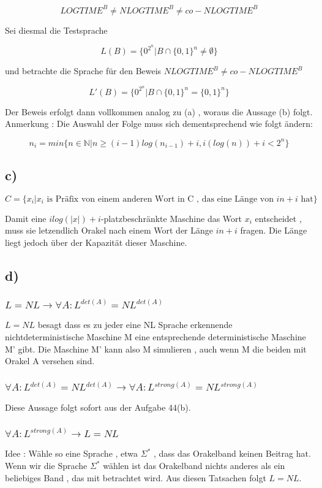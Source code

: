 \documentclass{article}
\begin{document}
			\[
				LOGTIME^B \neq NLOGTIME^B \neq co-NLOGTIME^B
			\]


			Sei diesmal die Testsprache 

			\[
				L(B) = \{0^{2^n} | B \cap \{0,1\}^n \neq \emptyset \}
			\]


			und betrachte die Sprache für den Beweis $NLOGTIME^B \neq co-NLOGTIME^B$
		
			\[
				L'(B) = \{ 0^{2^n} | B \cap \{0,1\}^n = \{0,1\}^n \}
			\]
			

			Der Beweis erfolgt dann vollkommen analog zu (a) , woraus die Aussage (b) folgt.
			Anmerkung : Die Auswahl der Folge muss sich dementsprechend wie folgt ändern:

			\[
				n_i = min \{ n \in \mathbb{N} | n \geq (i-1)log(n_{i-1}) + i , i(log (n))+i < 2^n\}
			\]
		

		\subsection*{c)}
			\[
				C = \{ x_i | x_i \text{ is Präfix von einem anderen Wort in C , das eine Länge von } in+i \text { hat} \}
			\]

		Damit eine $i log(|x|)+i$-platzbeschränkte Maschine das Wort $x_i$ entscheidet , muss sie letzendlich Orakel nach einem Wort der Länge $in+i$ fragen. Die Länge liegt jedoch über der Kapazität dieser Maschine. 


		\subsection*{d)}
			\subsubsection*{$L=NL \rightarrow \forall A : L^{det(A)} = NL^{det(A)}$}
				$L = NL $ besagt dass es zu jeder eine NL Sprache erkennende nichtdeterministische Maschine M eine entsprechende deterministische Maschine M' gibt. Die Maschine M' kann also M simulieren , auch wenn M die beiden mit Orakel A versehen sind. 
			\subsubsection*{$\forall A : L^{det(A)} = NL^{det(A)} \rightarrow \forall A : L^{strong(A)} = NL^{strong(A)}$} 
				Diese Aussage folgt sofort aus der Aufgabe 44(b). 
			\subsubsection*{$\forall A : L^{strong(A)} \rightarrow L=NL $}
				Idee : Wähle so eine Sprache , etwa $\Sigma^*$ , dass das Orakelband keinen Beitrag hat. Wenn wir die Sprache $\Sigma^*$ wählen ist das Orakelband nichts anderes als ein beliebiges Band , das mit betrachtet wird. Aus diesen Tatsachen folgt $L=NL$.   
\end{document}
